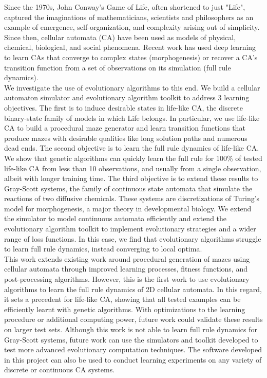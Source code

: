 
Since the 1970s, John Conway's Game of Life, often shortened to just "Life", captured the imaginations of mathematicians, scientists and philosophers as an example of emergence, self-organization, and complexity arising out of simplicity. Since then, cellular automata (CA) have been used as models of physical\cite{wolf2004lattice}, chemical\cite{gray1983autocatalytic}, biological\cite{deutsch2021bio}, and social phenomena\cite{white2000high}. Recent work has used deep learning to learn CAs that converge to complex states (morphogenesis)\cite{mordvintsev2020growing} or recover a CA's transition function from a set of observations on its simulation (full rule dynamics)\cite{wulff1992learning}.\\

We investigate the use of evolutionary algorithms to this end. We build a cellular automaton simulator and evolutionary algorithm toolkit to address 3 learning objectives. The first is to induce desirable states in life-like CA, the discrete binary-state family of models in which Life belongs. In particular, we use life-like CA to build a procedural maze generator and learn transition functions that produce mazes with desirable qualities like long solution paths and numerous dead ends. The second objective is to learn the full rule dynamics of life-like CA. We show that genetic algorithms can quickly learn the full rule for 100\% of tested life-like CA from less than 10 observations, and usually from a single observation, albeit with longer training time. The third objective is to extend these results to Gray-Scott systems, the family of continuous state automata that simulate the reactions of two diffusive chemicals. These systems are discretizations of Turing's model for morphogenesis, a major theory in developmental biology. We extend the simulator to model continuous automata efficiently and extend the evolutionary algorithm toolkit to implement evolutionary strategies and a wider range of loss functions. In this case, we find that evolutionary algorithms struggle to learn full rule dynamics, instead converging to local optima.\\

This work extends existing work around procedural generation of mazes using cellular automata\cite{adams2017procedural} through improved learning processes, fitness functions, and post-processing algorithms. However, this is the first work to use evolutionary algorithms to learn the full rule dynamics of 2D cellular automata. In this regard, it sets a precedent for life-like CA, showing that all tested examples can be efficiently learnt with genetic algorithms. With optimizations to the learning procedure or additional computing power, future work could validate these results on larger test sets. Although this work is not able to learn full rule dynamics for Gray-Scott systems, future work can use the simulators and toolkit developed to test more advanced evolutionary computation techniques. The software developed in this project can also be used to conduct learning experiments on any variety of discrete or continuous CA systems.\\